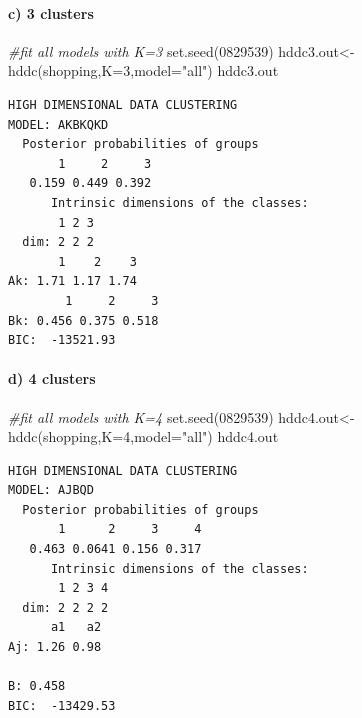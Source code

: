 \documentclass[
  11pt,
]{article}
\newenvironment{Shaded}{\begin{snugshade}}{\end{snugshade}}
\newcommand{\AttributeTok}[1]{\textcolor[rgb]{0.77,0.63,0.00}{#1}}
\newcommand{\CommentTok}[1]{\textcolor[rgb]{0.56,0.35,0.01}{\textit{#1}}}
\newcommand{\DecValTok}[1]{\textcolor[rgb]{0.00,0.00,0.81}{#1}}
\newcommand{\FunctionTok}[1]{\textcolor[rgb]{0.00,0.00,0.00}{#1}}
\newcommand{\NormalTok}[1]{#1}
\newcommand{\OtherTok}[1]{\textcolor[rgb]{0.56,0.35,0.01}{#1}}
\newcommand{\StringTok}[1]{\textcolor[rgb]{0.31,0.60,0.02}{#1}}
\begin{document}
\hypertarget{c-3-clusters}{%
\paragraph{c) 3 clusters}\label{c-3-clusters}}

\begin{Shaded}
\begin{Highlighting}[]
\CommentTok{\#fit all models with K=3}
\FunctionTok{set.seed}\NormalTok{(}\DecValTok{0829539}\NormalTok{)}
\NormalTok{hddc3.out}\OtherTok{\textless{}{-}}\FunctionTok{hddc}\NormalTok{(shopping,}\AttributeTok{K=}\DecValTok{3}\NormalTok{,}\AttributeTok{model=}\StringTok{"all"}\NormalTok{)}
\NormalTok{hddc3.out}
\end{Highlighting}
\end{Shaded}

\begin{verbatim}
HIGH DIMENSIONAL DATA CLUSTERING
MODEL: AKBKQKD
  Posterior probabilities of groups
       1     2     3
   0.159 0.449 0.392
      Intrinsic dimensions of the classes:
       1 2 3
  dim: 2 2 2
       1    2    3
Ak: 1.71 1.17 1.74
        1     2     3
Bk: 0.456 0.375 0.518
BIC:  -13521.93 
\end{verbatim}

\hypertarget{d-4-clusters}{%
\paragraph{d) 4 clusters}\label{d-4-clusters}}

\begin{Shaded}
\begin{Highlighting}[]
\CommentTok{\#fit all models with K=4}
\FunctionTok{set.seed}\NormalTok{(}\DecValTok{0829539}\NormalTok{)}
\NormalTok{hddc4.out}\OtherTok{\textless{}{-}}\FunctionTok{hddc}\NormalTok{(shopping,}\AttributeTok{K=}\DecValTok{4}\NormalTok{,}\AttributeTok{model=}\StringTok{"all"}\NormalTok{)}
\NormalTok{hddc4.out}
\end{Highlighting}
\end{Shaded}

\begin{verbatim}
HIGH DIMENSIONAL DATA CLUSTERING
MODEL: AJBQD
  Posterior probabilities of groups
       1      2     3     4
   0.463 0.0641 0.156 0.317
      Intrinsic dimensions of the classes:
       1 2 3 4
  dim: 2 2 2 2
      a1   a2
Aj: 1.26 0.98
        
B: 0.458
BIC:  -13429.53 
\end{verbatim}
\end{document}
